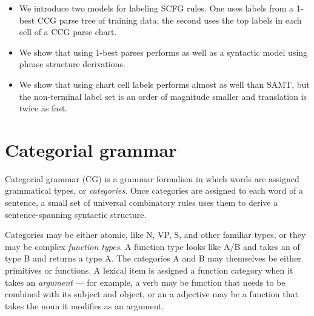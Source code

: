\documentclass[a4paper]{article}
\begin{document}
%
%
\begin{itemize}
\item We introduce two models for labeling SCFG rules. One uses labels from a 1-best CCG parse tree of training data; the second uses the top labels in each cell of a CCG parse chart.
\item We show that using 1-best parses performs as well as a syntactic model using phrase structure derivations.
\item We show that using chart cell labels performs almost as well than SAMT, but the non-terminal label set is an order of magnitude smaller and translation is twice as fast.
\end{itemize}

\section{Categorial grammar}
\label{sec:cg}

Categorial grammar (CG) \cite{cg,bar-hillel-cg} is a grammar formalism in which words are assigned grammatical types, or {\em categories}. Once categories are assigned to each word of a sentence, a small set of universal combinatory rules uses them to derive a sentence-spanning syntactic structure.

Categories may be either atomic, like N, VP, S, and other familiar types, or they may be complex {\em function types}. A function type looks like A/B and takes an of type B and returns a type A. The categories A and B may themselves be either primitives or functions. A lexical item is assigned a function category when it takes an {\em argument} --- for example, a verb may be function that needs to be combined with its subject and object, or an a adjective may be a function that takes the noun it modifies as an argument.
\end{document}
